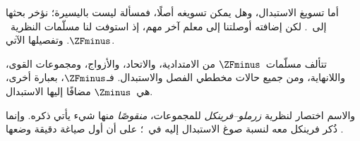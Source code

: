\documentclass[../../../include/open-logic-section]{subfiles}
\begin{document}

أما تسويغ الاستبدال، وهل يمكن تسويغه أصلًا، فمسألة ليست باليسيرة؛
نؤخر بحثها إلى~. لكن إضافته أوصلتنا إلى
معلم آخر مهم، إذ استوفت لنا مسلّمات النظرية~$\ZFminus$. وتفصيلها الآتي.

\begin{defn}
تتألف مسلّمات~$\ZFminus$ من الامتدادية، والاتحاد، والأزواج، ومجموعات
القوى، واللانهاية، ومن جميع حالات مخططي الفصل والاستبدال.
فـ$\ZFminus$، بعبارة أخرى، هي~$\Zminus$ مضافًا إليها الاستبدال.
\end{defn}
\noindent
والاسم اختصار لنظرية \emph{زرملو--فرينكل} للمجموعات، \emph{منقوصًا}
منها شيء يأتي ذكره. وإنما ذُكر فرينكل معه لنسبة صوغ الاستبدال إليه
في~\citeyear{Fraenkel1922}؛ على أن أول صياغة دقيقة وضعها
\citet{Skolem1922}.
\end{document}
